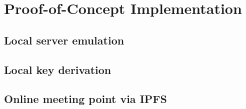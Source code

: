 \chapter{Proof-of-Concept Implementation}
\label{implementation}

\section{Local server emulation}

\section{Local key derivation}

\section{Online meeting point via IPFS}